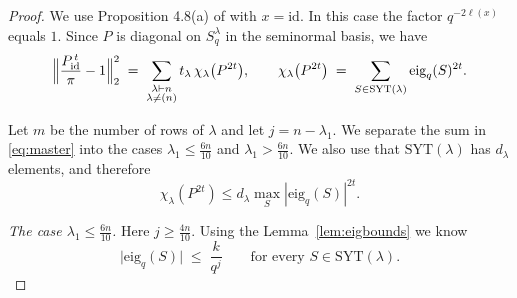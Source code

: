 \documentclass[11pt]{article}
\theoremstyle{plain}  %
\newcommand{\eig}{\text{eig}} %
\begin{document}
\begin{proof}
We use Proposition 4.8(a) of \cite{DiaconisRam2000} with $x=\mathrm{id}$. In
this case the factor $q^{-2\ell(x)}$ equals $1$. Since $P$ is diagonal on
$S^{\lambda}_q$ in the seminormal basis, we have
\begin{equation}\label{eq:master}
  \Bigl\|\frac{P^{\,t}_{\mathrm{id}}}{\pi}-1\Bigr\|_2^{2}
  \;=\; \sum_{\substack{\lambda \vdash n \\ \lambda \ne (n)}}
        t_\lambda\, \chi_\lambda\bigl(P^{2t}\bigr),
  \qquad
  \chi_\lambda\bigl(P^{2t}\bigr)
  \;=\; \sum_{S \in \mathrm{SYT}(\lambda)} \eig_q(S)^{2t}.
\end{equation}

Let $m$ be the number of rows of $\lambda$ and let $j = n-\lambda_1$. We
separate the sum in \eqref{eq:master} into the cases
$\lambda_1 \le \frac{6n}{10}$ and $\lambda_1 > \frac{6n}{10}$. We also use
that $\mathrm{SYT}(\lambda)$ has $d_\lambda$ elements, and therefore
$$\chi_\lambda(P^{2t}) \le d_\lambda \max_{S} |\eig_q(S)|^{2t}.$$



\emph{The case $\lambda_1 \le \frac{6n}{10}$.} Here
$j \ge \frac{4n}{10}$. Using the Lemma~\ref{lem:eigbounds} we know
\begin{equation}\label{eq:z1eig}
\bigl|\eig_q(S)\bigr| \;\le\; \frac{k}{q^{j}}
\qquad\text{for every } S \in \mathrm{SYT}(\lambda).
\end{equation}






\end{proof}
\end{document}
